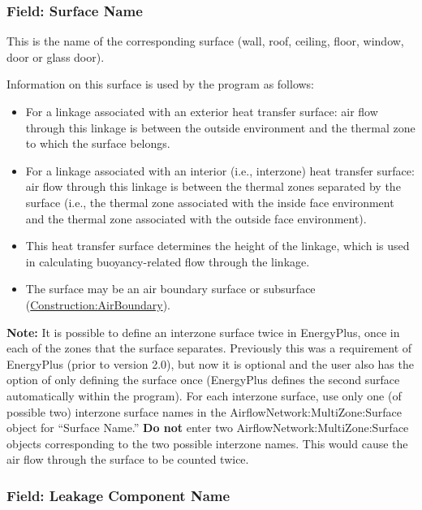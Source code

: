 \subsubsection{Field: Surface Name}\label{field-surface-name-000}

This is the name of the corresponding surface (wall, roof, ceiling, floor, window, door or glass door).

Information on this surface is used by the program as follows:

\begin{itemize}
\item
For a linkage associated with an exterior heat transfer surface: air flow through this linkage is between the outside environment and the thermal zone to which the surface belongs.

\item
For a linkage associated with an interior (i.e., interzone) heat transfer surface: air flow through this linkage is between the thermal zones separated by the surface (i.e., the thermal zone associated with the inside face environment and the thermal zone associated with the outside face environment).

\item
This heat transfer surface determines the height of the linkage, which is used in calculating buoyancy-related flow through the linkage.

\item
The surface may be an air boundary surface or subsurface (\hyperref[constructionairboundary]{Construction:AirBoundary}).
\end{itemize}

\textbf{Note:} It is possible to define an interzone surface twice in EnergyPlus, once in each of the zones that the surface separates. Previously this was a requirement of EnergyPlus (prior to version 2.0), but now it is optional and the user also has the option of only defining the surface once (EnergyPlus defines the second surface automatically within the program). For each interzone surface, use only one (of possible two) interzone surface names in the AirflowNetwork:MultiZone:Surface object for ``Surface Name.'' \textbf{Do not} enter two AirflowNetwork:MultiZone:Surface objects corresponding to the two possible interzone names. This would cause the air flow through the surface to be counted twice.

\subsubsection{Field: Leakage Component Name}\label{field-leakage-component-name}

